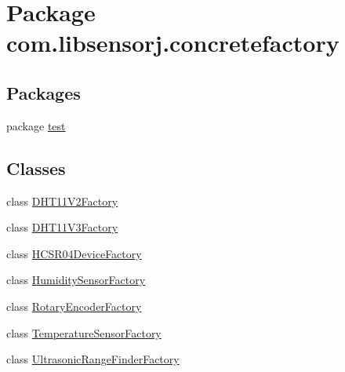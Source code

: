 \hypertarget{namespacecom_1_1libsensorj_1_1concretefactory}{}\section{Package com.\+libsensorj.\+concretefactory}
\label{namespacecom_1_1libsensorj_1_1concretefactory}
\subsection*{Packages}
\begin{DoxyCompactItemize}
\item 
package \hyperlink{namespacecom_1_1libsensorj_1_1concretefactory_1_1test}{test}
\end{DoxyCompactItemize}
\subsection*{Classes}
\begin{DoxyCompactItemize}
\item 
class \hyperlink{classcom_1_1libsensorj_1_1concretefactory_1_1DHT11V2Factory}{D\+H\+T11\+V2\+Factory}
\item 
class \hyperlink{classcom_1_1libsensorj_1_1concretefactory_1_1DHT11V3Factory}{D\+H\+T11\+V3\+Factory}
\item 
class \hyperlink{classcom_1_1libsensorj_1_1concretefactory_1_1HCSR04DeviceFactory}{H\+C\+S\+R04\+Device\+Factory}
\item 
class \hyperlink{classcom_1_1libsensorj_1_1concretefactory_1_1HumiditySensorFactory}{Humidity\+Sensor\+Factory}
\item 
class \hyperlink{classcom_1_1libsensorj_1_1concretefactory_1_1RotaryEncoderFactory}{Rotary\+Encoder\+Factory}
\item 
class \hyperlink{classcom_1_1libsensorj_1_1concretefactory_1_1TemperatureSensorFactory}{Temperature\+Sensor\+Factory}
\item 
class \hyperlink{classcom_1_1libsensorj_1_1concretefactory_1_1UltrasonicRangeFinderFactory}{Ultrasonic\+Range\+Finder\+Factory}
\end{DoxyCompactItemize}
